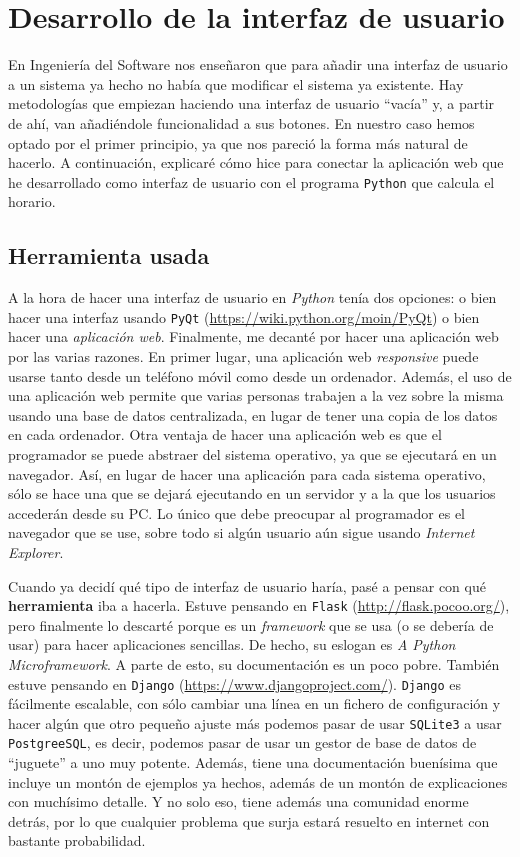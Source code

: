 \chapter{Desarrollo de la interfaz de usuario}
En Ingeniería del Software nos enseñaron que para añadir una interfaz de usuario a un sistema ya hecho no había que modificar el sistema ya existente. Hay metodologías que empiezan haciendo una interfaz de usuario ``vacía'' y, a partir de ahí, van añadiéndole funcionalidad a sus botones. En nuestro caso hemos optado por el primer principio, ya que nos pareció la forma más natural de hacerlo. A continuación, explicaré cómo hice para conectar la aplicación web que he desarrollado como interfaz de usuario con el programa \texttt{Python} que calcula el horario.

\section{Herramienta usada}
A la hora de hacer una interfaz de usuario en \textit{Python} tenía dos opciones: o bien hacer una interfaz usando \texttt{PyQt} (\url{https://wiki.python.org/moin/PyQt}) o bien hacer una \textit{aplicación web}. Finalmente, me decanté por hacer una aplicación web por las varias razones. En primer lugar, una aplicación web \textit{responsive} puede usarse tanto desde un teléfono móvil como desde un ordenador. Además, el uso de una aplicación web permite que varias personas trabajen a la vez sobre la misma usando una base de datos centralizada, en lugar de tener una copia de los datos en cada ordenador. Otra ventaja de hacer una aplicación web es que el programador se puede abstraer del sistema operativo, ya que se ejecutará en un navegador. Así, en lugar de hacer una aplicación para cada sistema operativo, sólo se hace una que se dejará ejecutando en un servidor y a la que los usuarios accederán desde su PC. Lo único que debe preocupar al programador es el navegador que se use, sobre todo si algún usuario aún sigue usando \textit{Internet Explorer}.

Cuando ya decidí qué tipo de interfaz de usuario haría, pasé a pensar con qué \textbf{herramienta} iba a hacerla. Estuve pensando en \texttt{Flask} (\url{http://flask.pocoo.org/}), pero finalmente lo descarté porque es un \textit{framework} que se usa (o se debería de usar) para hacer aplicaciones sencillas. De hecho, su eslogan es \textit{A Python Microframework}. A parte de esto, su documentación es un poco pobre. También estuve pensando en \texttt{Django} (\url{https://www.djangoproject.com/}). \texttt{Django} es fácilmente escalable, con sólo cambiar una línea en un fichero de configuración y hacer algún que otro pequeño ajuste más podemos pasar de usar \texttt{SQLite3} a usar \texttt{PostgreeSQL}, es decir, podemos pasar de usar un gestor de base de datos de ``juguete'' a uno muy potente. Además, tiene una documentación buenísima que incluye un montón de ejemplos ya hechos, además de un montón de explicaciones con muchísimo detalle. Y no solo eso, tiene además una comunidad enorme detrás, por lo que cualquier problema que surja estará resuelto en internet con bastante probabilidad.


